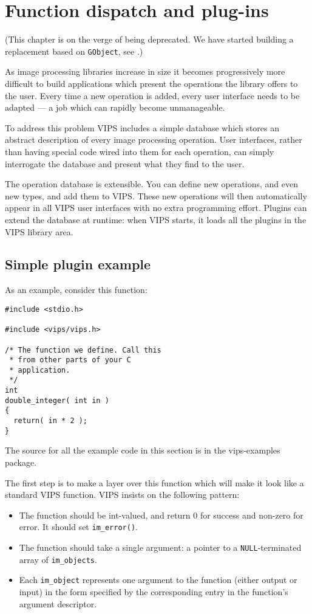 \section{Function dispatch and plug-ins}

(This chapter is on the verge of being deprecated. We have started building a
replacement based on \verb+GObject+, see .)

As image processing libraries increase in size it becomes progressively more
difficult to build applications which present the operations the library
offers to the user. Every time a new operation is added, every user interface
needs to be adapted --- a job which can rapidly become unmanageable.

To address this problem VIPS includes a simple database which stores an
abstract description of every image processing operation. User interfaces,
rather than having special code wired into them for each operation, can
simply interrogate the database and present what they find to the user.

The operation database is extensible. You can define new operations, and even
new types, and add them to VIPS. These new operations will then automatically
appear in all VIPS user interfaces with no extra programming effort. Plugins
can extend the database at runtime: when VIPS starts, it loads all the plugins
in the VIPS library area.

\subsection{Simple plugin example}

As an example, consider this function:

\begin{verbatim}
#include <stdio.h>

#include <vips/vips.h>

/* The function we define. Call this 
 * from other parts of your C 
 * application. 
 */
int
double_integer( int in )
{
  return( in * 2 );
}
\end{verbatim}

\noindent
The source for all the example code in this section is in the vips-examples
package. 

The first step is to make a layer over this function which will make it
look like a standard VIPS function. VIPS insists on the following pattern:

\begin{itemize}

\item
The function should be int-valued, and return 0 for success and non-zero
for error. It should set \verb+im_error()+.

\item
The function should take a single argument: a pointer to a
\verb+NULL+-terminated array of \verb+im_objects+.

\item
Each \verb+im_object+ represents one argument to the function (either output
or input) in the form specified by the corresponding entry in the function's
argument descriptor.

\end{itemize}

